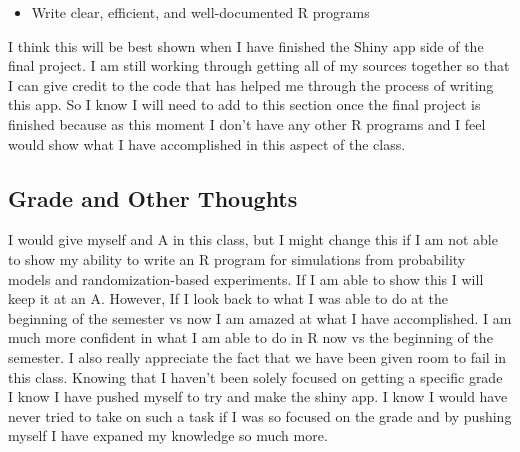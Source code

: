 \documentclass[
]{article}
\providecommand{\tightlist}{%
  \setlength{\itemsep}{0pt}\setlength{\parskip}{0pt}}
\begin{document}
\begin{itemize}
\tightlist
\item
  Write clear, efficient, and well-documented R programs
\end{itemize}

I think this will be best shown when I have finished the Shiny app side
of the final project. I am still working through getting all of my
sources together so that I can give credit to the code that has helped
me through the process of writing this app. So I know I will need to add
to this section once the final project is finished because as this
moment I don't have any other R programs and I feel would show what I
have accomplished in this aspect of the class.

\hypertarget{grade-and-other-thoughts}{%
\subsection{Grade and Other Thoughts}\label{grade-and-other-thoughts}}

I would give myself and A in this class, but I might change this if I am
not able to show my ability to write an R program for simulations from
probability models and randomization-based experiments. If I am able to
show this I will keep it at an A. However, If I look back to what I was
able to do at the beginning of the semester vs now I am amazed at what I
have accomplished. I am much more confident in what I am able to do in R
now vs the beginning of the semester. I also really appreciate the fact
that we have been given room to fail in this class. Knowing that I
haven't been solely focused on getting a specific grade I know I have
pushed myself to try and make the shiny app. I know I would have never
tried to take on such a task if I was so focused on the grade and by
pushing myself I have expaned my knowledge so much more.
\end{document}
